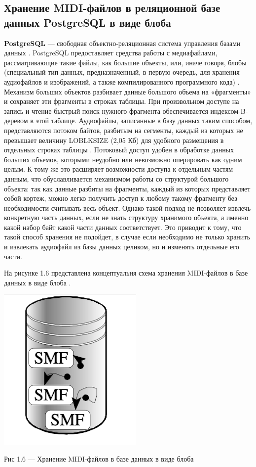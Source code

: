 \subsection{Хранение MIDI-файлов в реляционной базе данных PostgreSQL в виде блоба}

\textbf{PostgreSQL} — свободная объектно-реляционная система управления базами данных \cite{PSQL}. 
PostgreSQL предоставляет средства работы с медиафайлами, рассматривающие такие файлы, как большие объекты, или, иначе говоря, блобы (специальный тип данных, предназначенный, в первую очередь, для хранения аудиофайлов и изображений, а также компилированного программного кода) \cite{BLOB}. Механизм больших объектов разбивает данные большого объема на «фрагменты» и сохраняет эти фрагменты в строках таблицы. При произвольном доступе на запись и чтение быстрый поиск нужного фрагмента обеспечивается индексом-B-деревом в этой таблице. Аудиофайлы, записанные в базу данных таким способом, представляются потоком байтов, разбитым на сегменты, каждый из которых не превышает величину LOBLKSIZE (2,05 Кб) для удобного размещения в отдельных строках таблицы \cite{DPSQL}. Потоковый доступ удобен в обработке данных больших объемов, которыми неудобно или невозможно оперировать как одним целым. К тому же это расширяет возможности доступа к отдельным частям данным, что обуславливается механизмом работы со структурой большого объекта: так как данные разбиты на фрагменты, каждый из которых представляет собой кортеж, можно легко получить доступ к любому такому фрагменту без необходимости считывать весь объект. Однако такой подход не позволяет извлечь конкретную часть данных, если не знать структуру хранимого объекта, а именно какой набор байт какой части данных соответствует. Это приводит к тому, что такой способ хранения не подойдет, в случае если необходимо не только хранить и извлекать аудиофайл из базы данных целиком, но и изменять отдельные его части.  

На рисунке 1.6 представлена концептуальня схема хранения MIDI-файлов в базе данных в виде блоба \cite{CBMS}.
\begin{center}
		\includegraphics[scale=0.7]{img/blob}
		
			Рис 1.6 — Хранение MIDI-файлов в базе данных в виде блоба
\end{center} 

